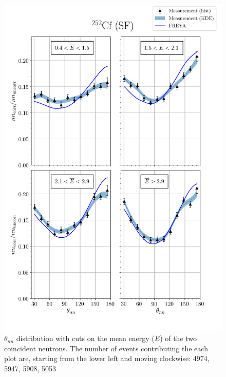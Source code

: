 \begin{figure}
\centering
    \includegraphics[width = 1.1\textwidth]{Content/Results/FinalCf252Resultw_freya1KDE.png}
    \caption{$\theta_{nn}$ distribution with cuts on the mean energy ($\overline{E}$) of the two coincident neutrons.
   The number of events contributing the each plot are, starting from the lower left and moving clockwise: 4974, 5947, 5908, 5053}
    \label{fig:Cf(1)}
\end{figure}
\FloatBarrier


